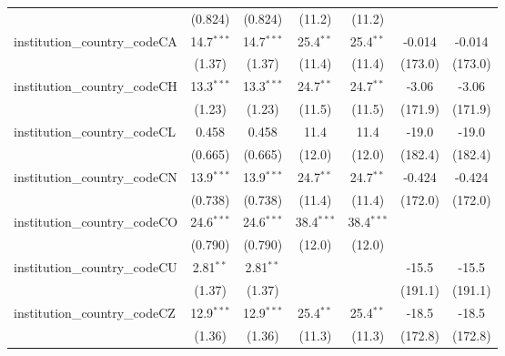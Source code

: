 \begin{tabular}{lcccccc}
                                         & (0.824)       & (0.824)       & (11.2)        & (11.2)        &               &   \\   
   institution\_country\_codeCA          & 14.7$^{***}$  & 14.7$^{***}$  & 25.4$^{**}$   & 25.4$^{**}$   & -0.014        & -0.014\\   
                                         & (1.37)        & (1.37)        & (11.4)        & (11.4)        & (173.0)       & (173.0)\\   
   institution\_country\_codeCH          & 13.3$^{***}$  & 13.3$^{***}$  & 24.7$^{**}$   & 24.7$^{**}$   & -3.06         & -3.06\\   
                                         & (1.23)        & (1.23)        & (11.5)        & (11.5)        & (171.9)       & (171.9)\\   
   institution\_country\_codeCL          & 0.458         & 0.458         & 11.4          & 11.4          & -19.0         & -19.0\\   
                                         & (0.665)       & (0.665)       & (12.0)        & (12.0)        & (182.4)       & (182.4)\\   
   institution\_country\_codeCN          & 13.9$^{***}$  & 13.9$^{***}$  & 24.7$^{**}$   & 24.7$^{**}$   & -0.424        & -0.424\\   
                                         & (0.738)       & (0.738)       & (11.4)        & (11.4)        & (172.0)       & (172.0)\\   
   institution\_country\_codeCO          & 24.6$^{***}$  & 24.6$^{***}$  & 38.4$^{***}$  & 38.4$^{***}$  &               &   \\   
                                         & (0.790)       & (0.790)       & (12.0)        & (12.0)        &               &   \\   
   institution\_country\_codeCU          & 2.81$^{**}$   & 2.81$^{**}$   &               &               & -15.5         & -15.5\\   
                                         & (1.37)        & (1.37)        &               &               & (191.1)       & (191.1)\\   
   institution\_country\_codeCZ          & 12.9$^{***}$  & 12.9$^{***}$  & 25.4$^{**}$   & 25.4$^{**}$   & -18.5         & -18.5\\   
                                         & (1.36)        & (1.36)        & (11.3)        & (11.3)        & (172.8)       & (172.8)\\   

\end{tabular}
